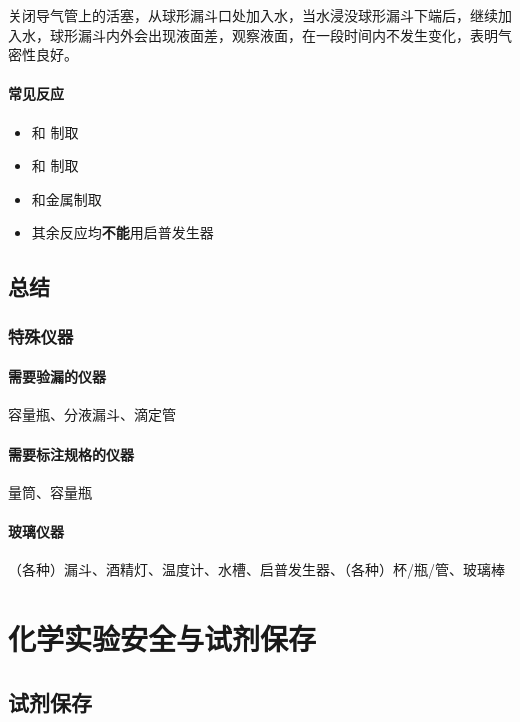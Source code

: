 \documentclass[10pt]{article}
\begin{document}
	关闭导气管上的活塞，从球形漏斗口处加入水，当水浸没球形漏斗下端后，继续加入水，球形漏斗内外会出现液面差，观察液面，在一段时间内不发生变化，表明气密性良好。
	
	\paragraph{常见反应}
	
	\begin{itemize}
		\item {}和 制取 
		\item {}和 制取 
		\item {}和金属制取 
		\item 其余反应均\textbf{不能}用启普发生器
	\end{itemize}
	
	
	\subsection{总结}
	
	\subsubsection{特殊仪器}
	
	\paragraph{需要验漏的仪器}
	
	容量瓶、分液漏斗、滴定管
	
	\paragraph{需要标注规格的仪器}
	
	量筒、容量瓶
	
	\paragraph{玻璃仪器}
	
	（各种）漏斗、酒精灯、温度计、水槽、启普发生器、（各种）杯/瓶/管、玻璃棒
	
	
	
	\clearpage
	\section{化学实验安全与试剂保存}
	
	
	\subsection{试剂保存}
	
\end{document}
